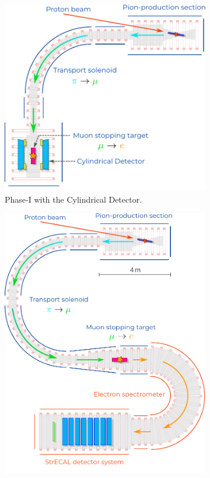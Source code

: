 \begin{figure}
    \centering
    \begin{subfigure}[b]{0.46\textwidth}
    \centering
        \includegraphics[width=\textwidth]{chapter2/comet_schematic_phase-I.pdf}
        \vspace{3cm}
        \caption{Phase-I with the Cylindrical Detector.}
    \end{subfigure}
    \hfill
    \begin{subfigure}[b]{0.49\textwidth}
        \centering
        \includegraphics[width=\textwidth]{chapter2/comet_schematic.pdf}

\end{subfigure}
\end{figure}

